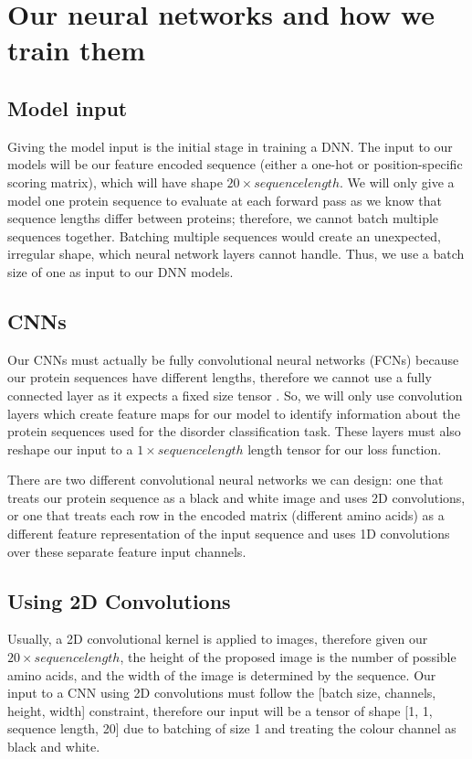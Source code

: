 \documentclass{l4proj}
\begin{document}
\section{Our neural networks and how we train them}

\subsection{Model input}

Giving the model input is the initial stage in training a DNN. The input to our models will be our feature encoded sequence (either a one-hot or position-specific scoring matrix), which will have shape $20\times sequence length$. We will only give a model one protein sequence to evaluate at each forward pass as we know that sequence lengths differ between proteins; therefore, we cannot batch multiple sequences together. Batching multiple sequences would create an unexpected, irregular shape, which neural network layers cannot handle. Thus, we use a batch size of one as input to our DNN models.

\subsection{CNNs}
\label{chap:design section:cnn}

Our CNNs must actually be fully convolutional neural networks (FCNs) because our protein sequences have different lengths, therefore we cannot use a fully connected layer as it expects a fixed size tensor \citep{fcn_seg}. So, we will only use convolution layers which create feature maps for our model to identify information about the protein sequences used for the disorder classification task. These layers must also reshape our input to a $1\times sequence length$ length tensor for our loss function.

There are two different convolutional neural networks we can design: one that treats our protein sequence as a black and white image and uses 2D convolutions, or one that treats each row in the encoded matrix (different amino acids) as a different feature representation of the input sequence and uses 1D convolutions over these separate feature input channels. 

\subsection*{Using 2D Convolutions}

Usually, a 2D convolutional kernel is applied to images, therefore given our $20\times sequence length$, the height of the proposed image is the number of possible amino acids, and the width of the image is determined by the sequence. Our input to a CNN using 2D convolutions must follow the [batch size, channels, height, width] constraint, therefore our input will be a tensor of shape [1, 1, sequence length, 20] due to batching of size 1 and treating the colour channel as black and white. 
\end{document}
